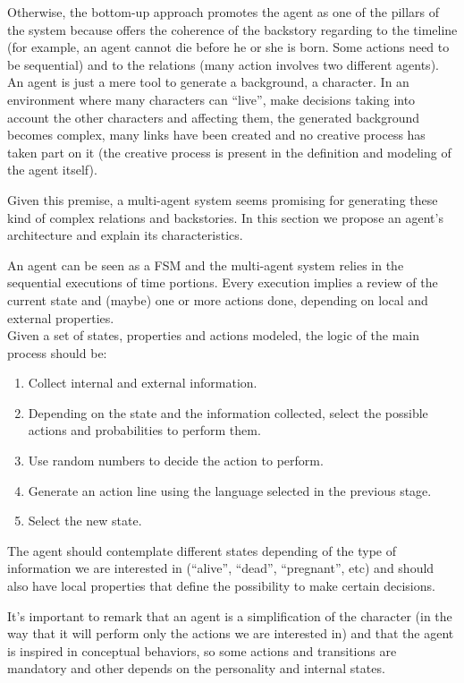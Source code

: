 \documentclass{sig-alternate}
\begin{document}
Otherwise, the bottom-up approach promotes the agent as one of the pillars of the system because offers the coherence of the backstory regarding to the timeline (for example, an agent cannot die before he or she is born. Some actions need to be sequential) and to the relations (many action involves two different agents). An agent is just a mere tool to generate a background, a character. In an environment where many characters can ``live'', make decisions taking into account the other characters and affecting them, the generated background becomes complex, many links have been created and no creative process has taken part on it (the creative process is present in the definition and modeling of the agent itself).

Given this premise, a multi-agent system seems promising for generating these kind of complex relations and backstories. In this section we propose an agent's architecture and explain its characteristics.



An agent can be seen as a FSM and the multi-agent system relies in the sequential executions of time portions. Every execution implies a review of the current state and (maybe) one or more actions done, depending on local and external properties.\\

Given a set of states, properties and actions modeled, the logic of the main process should be:

\begin{enumerate}
\item Collect internal and external information.
\item Depending on the state and the information collected, select the possible actions and probabilities to perform them.
\item Use random numbers to decide the action to perform.
\item Generate an action line using the language selected in the previous stage.
\item Select the new state.
\end{enumerate}


The agent should contemplate different states depending of the type of information we are interested in (``alive'', ``dead'', ``pregnant'', etc) and should also have local properties that define the possibility to make certain decisions.

It's important to remark that an agent is a simplification of the character (in the way that it will perform only the actions we are interested in) and that the agent is inspired in conceptual behaviors, so some actions and transitions are mandatory and other depends on the personality and internal states.\\
\end{document}
